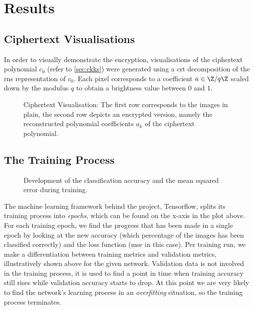 \chapter{Results}
\label{chap:results}
\section{Ciphertext Visualisations}
In order to visually demonstrate the encryption, visualisations of the ciphertext polynomial $c_0$ (refer to \cref{sec:ckks}) were generated using a \gls{crt} decomposition of the \gls{rns} representation of $c_0$.
Each pixel corresponds to a coefficient $a \in \Z / q\Z$ scaled down by the modulus $q$ to obtain a brightness value between $0$ and $1$.

\begin{figure}[H]
  \centering
  \caption[Visualisation of the plain input images compared to their ciphertext]{Ciphertext Visualisation: The first row corresponds to the images in plain, the second row depicts an encrypted version, namely the reconstructed polynomial coefficients $a_k$ of the ciphertext polynomial.}
  \label{fig:ciphertext-visualisation}
\end{figure}

\section{The Training Process}
\begin{figure}[H]
  \centering
  \pgfplotsset{/pgfplots/group/.cd,vertical sep=1.6cm}
  \caption[Classification accuracy and loss development during training]{Development of the classification accuracy and the mean squared error during training.}
  \label{fig:training-history}
\end{figure}

The machine learning framework behind the project, Tensorflow, splits its training process into \textit{epochs}, which can be found on the x-axis in the plot above.
For each training epoch, we find the progress that has been made in a single epoch by looking at the new accuracy (which percentage of the images has been classified correctly) and the loss function (\gls{mse} in this case).
Per training run, we make a differentiation between training metrics and validation metrics, illustratively shown above for the given network.
Validation data is not involved in the training process, it is used to find a point in time when training accuracy still rises while validation accuracy starts to drop.
At this point we are very likely to find the network's learning process in an \textit{overfitting} situation, so the training process terminates.

